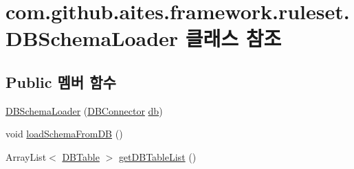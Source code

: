 \hypertarget{classcom_1_1github_1_1aites_1_1framework_1_1ruleset_1_1_d_b_schema_loader}{}\section{com.\+github.\+aites.\+framework.\+ruleset.\+D\+B\+Schema\+Loader 클래스 참조}
\label{classcom_1_1github_1_1aites_1_1framework_1_1ruleset_1_1_d_b_schema_loader}
\subsection*{Public 멤버 함수}
\begin{DoxyCompactItemize}
\item 
\mbox{\hyperlink{classcom_1_1github_1_1aites_1_1framework_1_1ruleset_1_1_d_b_schema_loader_a9ba40bda7e783bdee59222d04d4af490}{D\+B\+Schema\+Loader}} (\mbox{\hyperlink{classcom_1_1github_1_1aites_1_1framework_1_1globalknowledge_1_1_d_b_connector}{D\+B\+Connector}} \mbox{\hyperlink{classcom_1_1github_1_1aites_1_1framework_1_1ruleset_1_1_d_b_schema_loader_a2a610ebcfca7102369293e6728d0e9e2}{db}})
\item 
void \mbox{\hyperlink{classcom_1_1github_1_1aites_1_1framework_1_1ruleset_1_1_d_b_schema_loader_ad4c037b92081e1f0a9a8dd8ab91147e3}{load\+Schema\+From\+DB}} ()
\item 
Array\+List$<$ \mbox{\hyperlink{classcom_1_1github_1_1aites_1_1framework_1_1dbcomponent_1_1_d_b_table}{D\+B\+Table}} $>$ \mbox{\hyperlink{classcom_1_1github_1_1aites_1_1framework_1_1ruleset_1_1_d_b_schema_loader_aa168d37c1bb2c7a741d0a1ed35696162}{get\+D\+B\+Table\+List}} ()
\end{DoxyCompactItemize}
